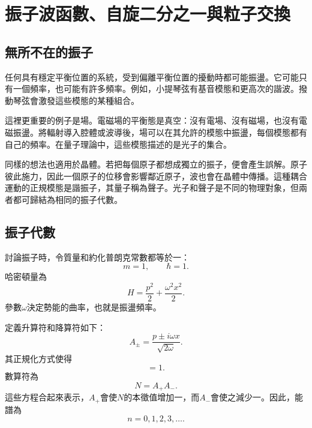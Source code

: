\chapter{振子波函數、自旋二分之一與粒子交換}

\section{無所不在的振子}

任何具有穩定平衡位置的系統，受到偏離平衡位置的擾動時都可能振盪。它可能只有一個頻率，也可能有許多頻率。例如，小提琴弦有基音模態和更高次的諧波。撥動琴弦會激發這些模態的某種組合。

這裡更重要的例子是場。電磁場的平衡態是真空：沒有電場、沒有磁場，也沒有電磁振盪。將輻射導入腔體或波導後，場可以在其允許的模態中振盪，每個模態都有自己的頻率。在量子理論中，這些模態描述的是光子的集合。

同樣的想法也適用於晶體。若把每個原子都想成獨立的振子，便會產生誤解。原子彼此施力，因此一個原子的位移會影響鄰近原子，波也會在晶體中傳播。這種耦合運動的正規模態是諧振子，其量子稱為聲子。光子和聲子是不同的物理對象，但兩者都可歸結為相同的振子代數。

\section{振子代數}

討論振子時，令質量和約化普朗克常數都等於一：
\[
m=1,\qquad \hbar=1.
\]
哈密頓量為
\begin{equation}
H=\frac{p^{2}}{2}+\frac{\omega^{2}x^{2}}{2}.
\end{equation}
參數\(\omega\)決定勢能的曲率，也就是振盪頻率。

定義升算符和降算符如下：
\begin{equation}
A_{\pm}=\frac{p\pm i\omega x}{\sqrt{2\omega}}.
\end{equation}
其正規化方式使得
\begin{equation}
[A_{-},A_{+}]=1.
\end{equation}
數算符為
\begin{equation}
N=A_{+}A_{-}.
\end{equation}
這些方程合起來表示，\(A_{+}\)會使\(N\)的本徵值增加一，而\(A_{-}\)會使之減少一。因此，能譜為
\begin{equation}
n=0,1,2,3,\ldots .
\end{equation}

